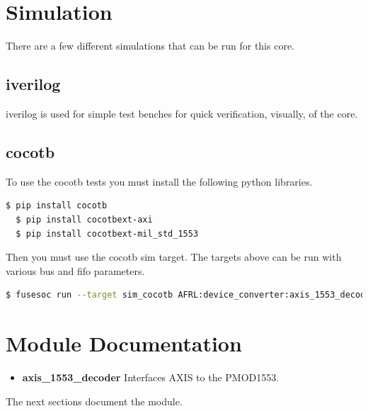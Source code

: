 \newpage

\section{Simulation}
\par
There are a few different simulations that can be run for this core.

\subsection{iverilog}
\par
iverilog is used for simple test benches for quick verification, visually, of the core.

\subsection{cocotb}
\par
To use the cocotb tests you must install the following python libraries.
\begin{lstlisting}[language=bash]
  $ pip install cocotb
  $ pip install cocotbext-axi
  $ pip install cocotbext-mil_std_1553
\end{lstlisting}

Then you must use the cocotb sim target. The targets above can be run with various bus and fifo parameters.

\begin{lstlisting}[language=bash]
  $ fusesoc run --target sim_cocotb AFRL:device_converter:axis_1553_decoder:1.0.0
\end{lstlisting}

\newpage

\section{Module Documentation} \label{Module Documentation}

\begin{itemize}
\item \textbf{axis\_1553\_decoder} Interfaces AXIS to the PMOD1553.\\
\end{itemize}
The next sections document the module.

